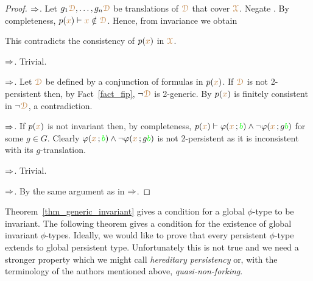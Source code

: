 \begin{proof}
  $\Rightarrow$.
  Let $g_1{\color{brown}\EuScript D},\dots,g_n{\color{brown}\EuScript D}$ be translations of ${\color{brown}\EuScript D}$ that cover ${\color{brown}\EuScript X}$.
  Negate .
  By completeness, $p({\color{brown} x})\vdash {\color{brown}x}\notin{\color{brown}\EuScript D}$.
  Hence, from invariance we obtain


  This contradicts the consistency of $p({\color{brown} x})$ in ${\color{brown}\EuScript X}$.

  $\Rightarrow$.
  Trivial.
  
  $\Rightarrow$.
  Let ${\color{brown}\EuScript D}$ be defined by a conjunction of formulas in $p({\color{brown} x})$.
  If ${\color{brown}\EuScript D}$ is not 2-persistent then, by Fact~\ref{fact_fip}, $\neg{\color{brown}\EuScript D}$ is 2-generic. 
  By  $p({\color{brown} x})$ is finitely consistent in   $\neg{\color{brown}\EuScript D}$, a contradiction.

  $\Rightarrow$.
  If $p({\color{brown} x})$ is not invariant then, by completeness, $p({\color{brown} x})\vdash\varphi({\color{brown} x}\,;{\color{green} b})\wedge\neg\varphi({\color{brown} x}\,;g{\color{green} b})$ for some $g\in G$.
  Clearly $\varphi({\color{brown} x}\,;{\color{green} b})\wedge\neg\varphi({\color{brown} x}\,;g{\color{green} b})$ is not 2-persistent as it is inconsistent with its $g$-translation.

  $\Rightarrow$.
  Trivial.

  $\Rightarrow$.
  By the same argument as in $\Rightarrow$.
\end{proof}


Theorem~\ref{thm_generic_invariant} gives a condition for a global $\phi$-type to be invariant.
The following theorem gives a condition for the existence of global invariant $\phi$-types.
Ideally, we would like to prove that every persistent $\phi$-type extends to global persistent type.
Unfortunately this is not true and we need a stronger property which we might call \textit{hereditary persistency\/} 
or, with the terminology of the authors mentioned above, \textit{quasi-non-forking}.

